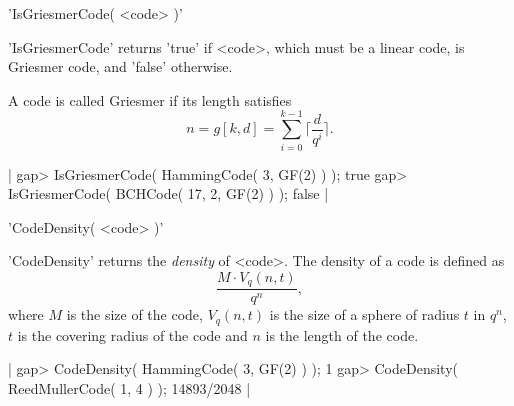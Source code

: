

'IsGriesmerCode( <code> )'

'IsGriesmerCode' returns 'true' if <code>, which must be a linear code,
is Griesmer code, and 'false' otherwise.

A code is called Griesmer if its length satisfies
\begin{equation}
    n = g[k,d] = \sum_{i=0}^{k-1} \lceil \frac{d}{q^i} \rceil.
\end{equation}

|    gap> IsGriesmerCode( HammingCode( 3, GF(2) ) );
    true
    gap> IsGriesmerCode( BCHCode( 17, 2, GF(2) ) );
    false |




'CodeDensity( <code> )'

'CodeDensity' returns the {\em density} of <code>.
The density of a code is defined as
\begin{equation}
    \frac{M \cdot V_q(n,t)}{q^n},
\end{equation}
where $M$ is the size of the code, $V_q(n,t)$ is the size of a sphere
of radius $t$ in $q^n$, $t$ is the covering radius of the code and
$n$ is the length of the code.

|    gap> CodeDensity( HammingCode( 3, GF(2) ) );
    1
    gap> CodeDensity( ReedMullerCode( 1, 4 ) );
    14893/2048 |

